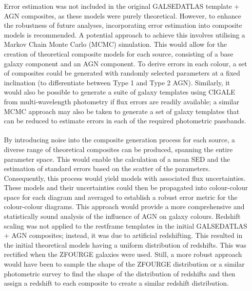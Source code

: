 Error estimation was not included in the original GALSEDATLAS template + AGN composites, as these models were purely theoretical. However, to enhance the robustness of future analyses, incorporating error estimation into composite models is recommended. A potential approach to achieve this involves utilising a Markov Chain Monte Carlo (MCMC) simulation. This would allow for the creation of theoretical composite models for each source, consisting of a base galaxy component and an AGN component. To derive errors in each colour, a set of composites could be generated with randomly selected parameters at a fixed inclination (to differentiate between Type 1 and Type 2 AGN). Similarly, it would also be possible to generate a suite of galaxy templates using CIGALE from multi-wavelength photometry if flux errors are readily available; a similar MCMC approach may also be taken to generate a set of galaxy templates that can be reduced to estimate errors in each of the required photometric passbands.\\\\
By introducing noise into the composite generation process for each source, a diverse range of theoretical composites can be produced, spanning the entire parameter space. This would enable the calculation of a mean SED and the estimation of standard errors based on the scatter of the parameters. Consequently, this process would yield models with associated flux uncertainties. These models and their uncertainties could then be propagated into colour-colour space for each diagram and averaged to establish a robust error metric for the colour-colour diagrams. This approach would provide a more comprehensive and statistically sound analysis of the influence of AGN on galaxy colours. Redshift scaling was not applied to the restframe templates in the initial GALSEDATLAS + AGN composites; instead, it was due to artificial redshifting. This resulted in the initial theoretical models having a uniform distribution of redshifts. This was rectified when the ZFOURGE galaxies were used. Still, a more robust approach would have been to sample the shape of the ZFOURGE distribution or a similar photometric survey to find the shape of the distribution of redshifts and then assign a redshift to each composite to create a similar redshift distribution. 

